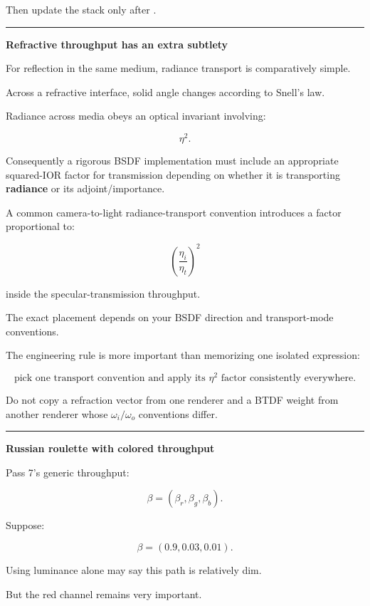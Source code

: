 Then update the stack only after .

\begin{center}\rule{0.5\linewidth}{0.5pt}\end{center}

\textbf{Refractive throughput has an extra subtlety}

For reflection in the same medium, radiance transport is comparatively simple.

Across a refractive interface, solid angle changes according to Snell's law.

Radiance across media obeys an optical invariant involving:

\[
\eta^2.
\]

Consequently a rigorous BSDF implementation must include an appropriate squared-IOR factor for transmission depending on whether it is transporting \textbf{radiance} or its adjoint/importance.

A common camera-to-light radiance-transport convention introduces a factor proportional to:

\[
\boxed{
\left(
\frac{\eta_i}{\eta_t}
\right)^2
}
\]

inside the specular-transmission throughput.

The exact placement depends on your BSDF direction and transport-mode conventions.

The engineering rule is more important than memorizing one isolated expression:

\[
\boxed{
\text{pick one transport convention and apply its } \eta^2 \text{ factor consistently everywhere}.
}
\]

Do not copy a refraction vector from one renderer and a BTDF weight from another renderer whose \(\omega_i/\omega_o\) conventions differ.

\begin{center}\rule{0.5\linewidth}{0.5pt}\end{center}

\textbf{Russian roulette with colored throughput}

Pass 7's generic throughput:

\[
\beta=
(\beta_r,\beta_g,\beta_b).
\]

Suppose:

\[
\beta=
(0.9,0.03,0.01).
\]

Using luminance alone may say this path is relatively dim.

But the red channel remains very important.

